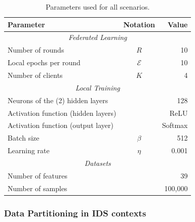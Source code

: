 \begin{table}
  \centering
  \caption{Parameters used for all scenarios.}
  \label{tbl:parameters}
  \begin{tabular}{lcr}
     \toprule
      \textbf{Parameter} & \textbf{Notation} & \textbf{Value} \\
      \midrule
      \multicolumn{3}{c}{\emph{Federated Learning}} \\
      \midrule
      Number of rounds & $R$ & 10 \\
      Local epochs per round & $\mathcal{E}$ & 10 \\
      Number of clients & $K$ & 4 \\
      \midrule
      \multicolumn{3}{c}{\emph{Local Training}} \\
      \midrule
      Neurons of the (2) hidden layers &  & 128 \\
      Activation function (hidden layers) &  & ReLU \\
      Activation function (output layer) &  & Softmax \\
      Batch size & $\beta$ & 512 \\
      Learning rate & $\eta$ & 0.001 \\
      \midrule
      \multicolumn{3}{c}{\emph{Datasets}} \\
      \midrule
      Number of features &  & 39 \\
      Number of samples &  & 100,000 \\
      \bottomrule
  \end{tabular}
\end{table}

\subsubsection{Data Partitioning in IDS contexts\label{sec:app.demo.setup.ids}}



